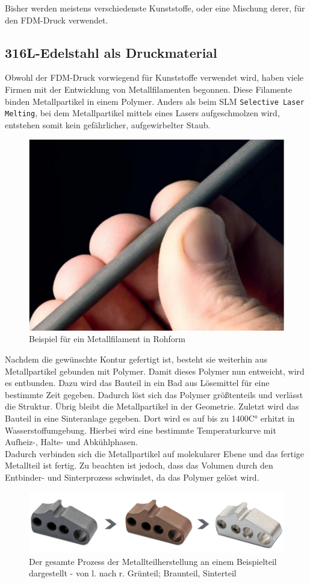 Bisher werden meistens verschiedenste Kunststoffe, oder eine Mischung derer, für den FDM-Druck verwendet.

\subsection{316L-Edelstahl als Druckmaterial}

Obwohl der FDM-Druck vorwiegend für Kunststoffe verwendet wird, haben viele Firmen mit der Entwicklung von Metallfilamenten begonnen. Diese Filamente binden Metallpartikel in einem Polymer. Anders als beim SLM \texttt{Selective Laser Melting}, bei dem Metallpartikel mittels eines Lasers aufgeschmolzen wird, entstehen somit kein gefährlicher, aufgewirbelter Staub. \autocite{MetalAdditiveMan}
\begin{figure}[h]
	\centering
	\includegraphics[width=0.5\linewidth]{bilder/Beispiel_Metallfilament.png}
        \caption[Beispiel für ein Metallfilament in Rohform] {Beispiel für ein Metallfilament in Rohform \autocite{MetalAdditiveMan}}
	\label{fig:FilamentBeispiel}
\end{figure}

Nachdem die gewünschte Kontur gefertigt ist, besteht sie weiterhin aus Metallpartikel gebunden mit Polymer. Damit dieses Polymer nun entweicht, wird es entbunden. Dazu wird das Bauteil in ein Bad aus Lösemittel für eine bestimmte Zeit gegeben. Dadurch löst sich das Polymer größtenteils und verlässt die Struktur. Übrig bleibt die Metallpartikel in der Geometrie. Zuletzt wird das Bauteil in eine Sinteranlage gegeben. Dort wird es auf bis zu 1400C° erhitzt in Wasserstoffumgebung. Hierbei wird eine bestimmte Temperaturkurve mit Aufheiz-, Halte- und Abkühlphasen.\\
Dadurch verbinden sich die Metallpartikel auf molekularer Ebene und das fertige Metallteil ist fertig. Zu beachten ist jedoch, dass das Volumen durch den Entbinder- und Sinterprozess schwindet, da das Polymer gelöst wird.

\begin{figure}[h]
	\centering
	\includegraphics[width=0.8\linewidth]{bilder/img_gruenteil-braunteil-sinterteil.png}
        \caption[Der gesamte Prozess der Metallteilherstellung an einem Beispielteil dargestellt] {Der gesamte Prozess der Metallteilherstellung an einem Beispielteil dargestellt - von l. nach r. Grünteil; Braunteil, Sinterteil \autocite{junghans}}
	\label{fig:Prozess}
\end{figure}

